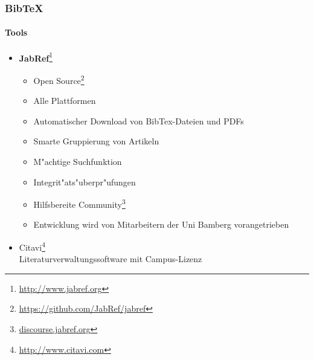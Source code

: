 \begin{frame}
\frametitle{BibTeX}
\framesubtitle{Tools}
\begin{itemize}
\item \textbf{JabRef}\footnote{\url{http://www.jabref.org}}
\begin{itemize}
	\item Open Source\footnote{\url{https://github.com/JabRef/jabref}}
	\item Alle Plattformen
	\item Automatischer Download von BibTex-Dateien und PDFs
	\item Smarte Gruppierung von Artikeln
	\item M"achtige Suchfunktion
	\item Integrit"ats"uberpr"ufungen
	\item Hilfsbereite Community\footnote{\url{discourse.jabref.org}}
	\item Entwicklung wird von Mitarbeitern der Uni Bamberg vorangetrieben
\end{itemize}
	
\item Citavi\footnote{\url{http://www.citavi.com}}\\
Literaturverwaltungssoftware mit Campus-Lizenz

\end{itemize}
\end{frame}